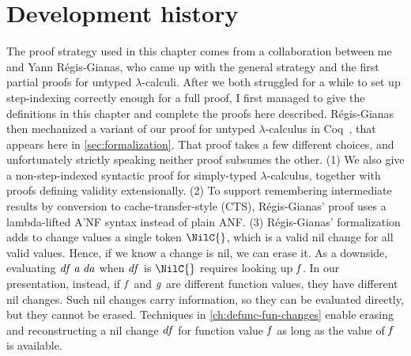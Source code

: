 


\section{Development history}
\label{sec:ilc-bsos-dev-history}
The proof strategy used in this chapter comes from a
collaboration between me and Yann Régis-Gianas, who came up with the
general strategy and the first partial proofs for untyped $\lambda$-calculi.
After we both struggled for a while to set up step-indexing correctly enough for a
full proof, I first managed to give the definitions in this chapter and
complete the proofs here described. Régis-Gianas then mechanized a variant of
our proof for untyped $\lambda$-calculus in Coq~\citep{Giarrusso2019Incremental},
that appears here in \cref{sec:formalization}.
That proof takes a few different choices, and unfortunately strictly speaking neither proof
subsumes the other. (1) We also give a non-step-indexed syntactic proof for
simply-typed $\lambda$-calculus, together with proofs defining validity extensionally.
(2) To support remembering intermediate
results by conversion to cache-transfer-style (CTS),
Régis-Gianas' proof uses a lambda-lifted A'NF syntax instead of plain ANF\@.
(3) Régis-Gianas' formalization adds to change values a single token \ensuremath{\NilC{}},
which is a valid nil change for all valid values. Hence, if we know a change is
nil, we can erase it. As a downside, evaluating \ensuremath{\Varid{df}\;\Varid{a}\;\Varid{da}} when \ensuremath{\Varid{df}} is \ensuremath{\NilC{}}
requires looking up \ensuremath{\Varid{f}}.
In our presentation, instead, if \ensuremath{\Varid{f}} and \ensuremath{\Varid{g}} are different function values, they
have different nil changes. Such nil changes carry information, so they can be
evaluated directly, but they cannot be erased. Techniques in
\cref{ch:defunc-fun-changes} enable erasing and reconstructing a nil change \ensuremath{\Varid{df}}
for function value \ensuremath{\Varid{f}} as long as the value of \ensuremath{\Varid{f}} is available.

